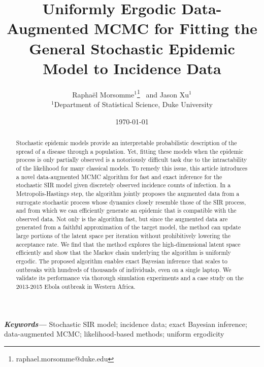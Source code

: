 \documentclass[11pt]{article}
\begin{document}
	
	\providecommand{\keywords}[1]
	{
		\small	
		\textbf{\textit{Keywords---}} #1
	}
	
	
	\title{%
		Uniformly Ergodic Data-Augmented MCMC for Fitting the General Stochastic Epidemic Model to Incidence Data}
		
	\author{
	Rapha\"{e}l Morsomme$^{1}$\footnote{raphael.morsomme@duke.edu} \ and Jason Xu$^{1}$ \\
	\small $^{1}$Department of Statistical Science, Duke University \\
	}
	\date{
	\today
	}	
	\maketitle
	
	\begin{abstract}
		Stochastic epidemic models provide an interpretable probabilistic description of the spread of a disease through a population. Yet, fitting these models when the epidemic process is only partially observed is a notoriously difficult task due to the intractability of the likelihood for many classical models. To remedy this issue, this article introduces a novel data-augmented MCMC algorithm for fast and exact inference for the stochastic SIR model given discretely observed incidence counts of infection. In a Metropolis-Hastings step, the algorithm jointly proposes the augmented data from a surrogate stochastic process whose dynamics closely resemble those of the SIR process, and from which we can efficiently generate an epidemic that is compatible with the observed data. Not only is the algorithm fast, but since the augmented data are generated from a faithful approximation of the target model, the method can update large portions of the latent space per iteration without prohibitively lowering the acceptance rate. We find that the method explores the high-dimensional latent space efficiently and show that the Markov chain underlying the algorithm is uniformly ergodic.
		The proposed algorithm enables exact Bayesian inference that scales to outbreaks with hundreds of thousands of individuals,  even on a single laptop. We validate its performance via thorough simulation experiments and a case study on the 2013-2015 Ebola outbreak in Western Africa.
	\end{abstract}
	\keywords{Stochastic SIR model; incidence data; exact Bayesian inference; data-augmented MCMC; likelihood-based methods; uniform ergodicity}
	
\end{document}
